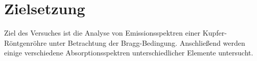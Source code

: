 \section{Zielsetzung}
Ziel des Versuches ist die Analyse von Emissionsspektren einer 
Kupfer-Röntgenröhre unter Betrachtung der Bragg-Bedingung. Anschließend werden
einige verschiedene Absorptionsspektren unterschiedlicher Elemente untersucht.